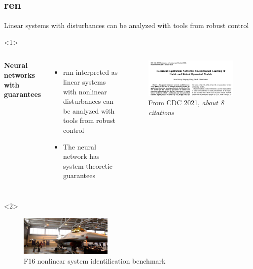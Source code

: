 \documentclass[8pt, t,
aspectratio=169,%
]{beamer}
\begin{document}
\subsection{\Acrlong{ren}}
\begin{frame}{Linear systems with disturbances can be analyzed with tools from robust control}
    \vspace{-0.5cm}
    \begin{onlyenv}<1>
        \begin{columns}
                \textbf{Neural networks with guarantees}
                \begin{itemize}
                    \item \Gls{rnn} interpreted as linear systems with nonlinear disturbances can be analyzed with tools from robust control
                    \item The neural network has system theoretic guarantees
                \end{itemize}
                \begin{figure}
                    \includegraphics[width=\textwidth]{ren.png}
                    \caption{From CDC 2021, \emph{about 8 citations}\cite{revay2021recurrent}}
                \end{figure}
        \end{columns}
    \end{onlyenv}
    \begin{onlyenv}<2>
        \begin{figure}
            \includegraphics[width=0.4\textwidth]{fig/f16.png}
            \caption{F16 nonlinear system identification benchmark}
        \end{figure}
        

\end{onlyenv}
\end{frame}
\end{document}
